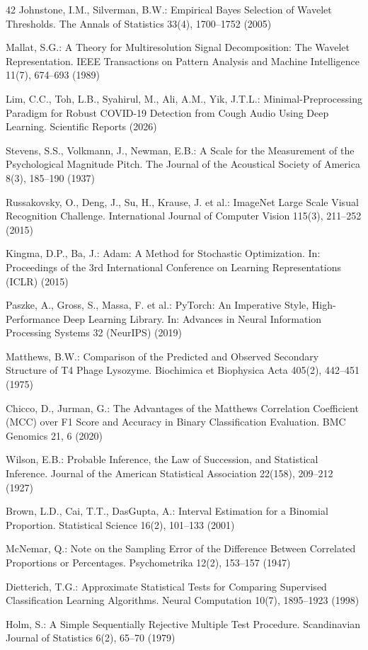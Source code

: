 \documentclass[pdflatex,sn-mathphys-num]{sn-jnl}
\begin{document}
\begin{thebibliography}{42}
Johnstone, I.M., Silverman, B.W.: Empirical Bayes Selection of Wavelet Thresholds. The Annals of Statistics 33(4), 1700–1752 (2005)

Mallat, S.G.: A Theory for Multiresolution Signal Decomposition: The Wavelet Representation. IEEE Transactions on Pattern Analysis and Machine Intelligence 11(7), 674–693 (1989)

Lim, C.C., Toh, L.B., Syahirul, M., Ali, A.M., Yik, J.T.L.: Minimal-Preprocessing Paradigm for Robust COVID-19 Detection from Cough Audio Using Deep Learning. Scientific Reports (2026)

Stevens, S.S., Volkmann, J., Newman, E.B.: A Scale for the Measurement of the Psychological Magnitude Pitch. The Journal of the Acoustical Society of America 8(3), 185–190 (1937)

Russakovsky, O., Deng, J., Su, H., Krause, J. et al.: ImageNet Large Scale Visual Recognition Challenge. International Journal of Computer Vision 115(3), 211–252 (2015)

Kingma, D.P., Ba, J.: Adam: A Method for Stochastic Optimization. In: Proceedings of the 3rd International Conference on Learning Representations (ICLR) (2015)

Paszke, A., Gross, S., Massa, F. et al.: PyTorch: An Imperative Style, High-Performance Deep Learning Library. In: Advances in Neural Information Processing Systems 32 (NeurIPS) (2019)

Matthews, B.W.: Comparison of the Predicted and Observed Secondary Structure of T4 Phage Lysozyme. Biochimica et Biophysica Acta 405(2), 442–451 (1975)

Chicco, D., Jurman, G.: The Advantages of the Matthews Correlation Coefficient (MCC) over F1 Score and Accuracy in Binary Classification Evaluation. BMC Genomics 21, 6 (2020)

Wilson, E.B.: Probable Inference, the Law of Succession, and Statistical Inference. Journal of the American Statistical Association 22(158), 209–212 (1927)

Brown, L.D., Cai, T.T., DasGupta, A.: Interval Estimation for a Binomial Proportion. Statistical Science 16(2), 101–133 (2001)

McNemar, Q.: Note on the Sampling Error of the Difference Between Correlated Proportions or Percentages. Psychometrika 12(2), 153–157 (1947)

Dietterich, T.G.: Approximate Statistical Tests for Comparing Supervised Classification Learning Algorithms. Neural Computation 10(7), 1895–1923 (1998)

Holm, S.: A Simple Sequentially Rejective Multiple Test Procedure. Scandinavian Journal of Statistics 6(2), 65–70 (1979)

\end{thebibliography}
\end{document}
